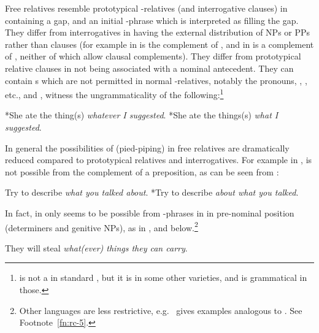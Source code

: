 \documentclass[output=paper,nonflat,draftmode]{./langsci/langscibook}
\begin{document}
Free relatives resemble prototypical -relatives (and interrogative clauses) in containing a
gap, and an initial -phrase which is interpreted as filling the gap.  They
differ from interrogatives in having  the external
distribution of NPs or PPs rather than clauses (for example in   is the complement of , and in  
is a complement of , neither of which allow clausal complements). They differ
from prototypical relative clauses in not being associated with a nominal antecedent. They can
contain s which are not permitted in normal -relatives, notably the
 pronouns, , , etc., and , witness the
ungrammaticality of the following:\footnote{ is not a  in
  standard , but it is in some other varieties, and  is grammatical in
  those.}
\begin{exe}\ex\begin{xlist}\label{x:rc-144}
  \ex\label{x:rc-145} *She ate the thing(s) \emph{whatever I suggested}.
  \ex\label{x:rc-146} *She ate the things(s) \emph{what I suggested}.
\end{xlist}\end{exe}
In general the possibilities of  (pied-piping) in free relatives are
dramatically reduced compared to prototypical relatives and interrogatives. For example in , 
 is not possible from the complement of a preposition, as can be seen
from :
\begin{exe}\ex\begin{xlist}
  \ex\label{x:rc-147} Try to describe \emph{what you talked about}.
  \ex\label{x:rc-148} *Try to describe \emph{about what you talked}.
\end{xlist}\end{exe}
In fact, in    only seems to be possible from -phrases in in pre-nominal position
(determiners and genitive NPs), as in , and  below.\footnote{Other
  languages are less restrictive, e.g.\ \cite[57]{Mueller99b} gives  examples
  analogous to . See Footnote~\ref{fn:rc-5}.}
\begin{exe}\ex
  \label{x:rc-149} They will steal \emph{what(ever) things they can carry}.
\end{exe}
\end{document}
